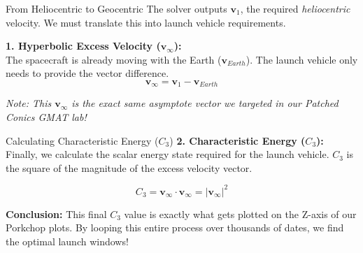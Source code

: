 \documentclass[11pt]{beamer}
\begin{document}
\begin{frame}{From Heliocentric to Geocentric}
    The solver outputs $\bm{v}_1$, the required \textit{heliocentric} velocity. We must translate this into launch vehicle requirements.
    
    \vspace{0.3cm}
    \textbf{1. Hyperbolic Excess Velocity ($\bm{v}_\infty$):} \\
    The spacecraft is already moving with the Earth ($\bm{v}_{Earth}$). The launch vehicle only needs to provide the vector difference.
    \begin{equation}
        \bm{v}_\infty = \bm{v}_1 - \bm{v}_{Earth}
    \end{equation}
    
    \vspace{0.2cm}
    \textit{Note: This $\bm{v}_\infty$ is the exact same asymptote vector we targeted in our Patched Conics GMAT lab!}
\end{frame}

\begin{frame}{Calculating Characteristic Energy ($C_3$)}
    \textbf{2. Characteristic Energy ($C_3$):} \\
    Finally, we calculate the scalar energy state required for the launch vehicle. $C_3$ is the square of the magnitude of the excess velocity vector.
    
    \begin{equation}
        C_3 = \bm{v}_\infty \cdot \bm{v}_\infty = |\bm{v}_\infty|^2
    \end{equation}
    
    \vspace{0.3cm}
    \textbf{Conclusion:} 
    This final $C_3$ value is exactly what gets plotted on the Z-axis of our Porkchop plots. By looping this entire process over thousands of dates, we find the optimal launch windows!
\end{frame}
\end{document}
